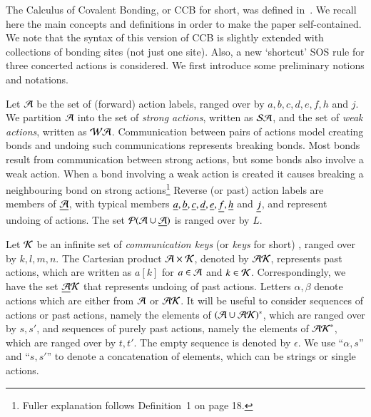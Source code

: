 %
The Calculus of Covalent Bonding, or CCB for short, was defined in~\cite{KU2017}. 
We recall here the main concepts and definitions in order to make the paper self-contained. 
We note that the syntax of this version of CCB is slightly extended with collections of bonding sites (not just one site).
Also, a new `shortcut'  SOS rule for three concerted actions is considered. 
We first introduce some preliminary notions and notations.

Let $\mathcal{A}$ be the set of (forward) action labels, 
ranged over by $a,b,c,d,e,f,h$ and $j$. We partition $\mathcal{A}$ into the set of \emph{strong actions}, written as
$\mathcal{SA}$, and the set of \emph{weak actions}, written as $\mathcal{WA}$. 
Communication between pairs of actions model creating bonds and undoing such communications represents breaking bonds. Most bonds result from communication between strong actions, but some bonds also involve a weak action. When a bond involving a weak action is created it causes breaking a neighbouring bond on strong actions\footnote{Fuller explanation follows Definition~1 on page 18.
}
Reverse (or past) action labels are members of
$\underline{\mathcal{A}}$, with typical members $\underline {a},\underline {b}, \underline {c},\underline {d}, \underline {e} ,\underline {f}, \underline {h}$ and $\underline {j}$, and represent 
undoing of actions. The set $\mathcal{P}(\mathcal{A} \cup \underline{\mathcal{A}})$ is ranged over by $L$.

Let $\mathcal{K}$ be an infinite set of {\em communication keys} (or {\em keys} for short)
\cite{PhillipsUlidowski06,PHILLIPS200770}, ranged over by $k,l, m,n$. The Cartesian product $\mathcal A \times \mathcal{K}$, denoted by $\mathcal{AK}$,
 represents past actions, which are written as $a[k]$ for $a\in \mathcal{A}$ and $k\in\mathcal{K}$. 
Correspondingly, we have the set $\underline{\mathcal{A}}\mathcal{K}$ that represents undoing of past actions. Letters $\alpha, \beta$ denote actions which are either from $\mathcal{A}$ or $\mathcal{AK}$. It will be 
useful to consider sequences of actions or past actions, namely the elements of $(\mathcal{A} \cup \mathcal{AK})^*$, 
which are ranged over by $s,s'$, and sequences of purely past actions, namely the elements of $\mathcal{AK}^*$, 
which are ranged over by $t,t'$. The empty sequence is denoted by $\epsilon$. We use ``$\alpha, s$'' and
``$s,s'$'' to denote a concatenation of elements, which can be strings or single actions.

